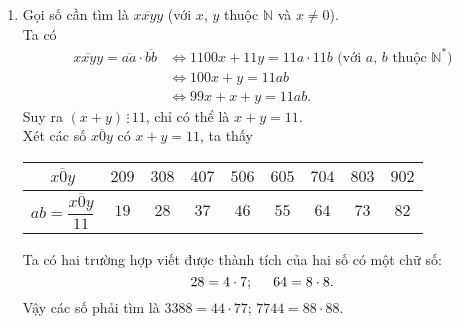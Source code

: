 \begin{bt}
{\begin{enumerate}
   \item Gọi số cần tìm là $\overline{xxyy}$ (với $x$, $y$ thuộc $\mathbb{N}$ và $x \neq 0$).\\
   Ta có
   \begin{align*}
    \overline{xxyy} = \overline{aa} \cdot \overline{bb} & \Leftrightarrow 1100x + 11y = 11a \cdot 11b \text{ (với $a$, $b$ thuộc $\mathbb{N}^*$)}\\
    & \Leftrightarrow 100x + y = 11ab \\
    & \Leftrightarrow 99x + x + y = 11ab.
   \end{align*}
   Suy ra $(x + y) \, \vdots \, 11$, chỉ có thể là $x + y = 11$.\\
   Xét các số $\overline{x0y}$ có $x + y = 11$, ta thấy
   \begin{center}
    \begin{tabular}{|c|c|c|c|c|c|c|c|c|}
    \hline
    $\overline{x0y}$                  & $209$ & $308$ & $407$ & $506$ & $605$ & $704$ & $803$ & $902$\\
    \hline
    $ab = \dfrac{\overline{x0y}}{11}$ & $19$  & $28$  & $37$  & $46$  & $55$  & $64$  & $73$  & $82$\\
    \hline
    \end{tabular}
   \end{center}
   Ta có hai trường hợp viết được thành tích của hai số có một chữ số:
   $$28 = 4 \cdot 7; \hspace*{0.5cm} 64 = 8 \cdot 8.$$
   Vậy các số phải tìm là $3388 = 44 \cdot 77$; $7744 = 88 \cdot 88$.
  \end{enumerate}      
  }
\end{bt}


